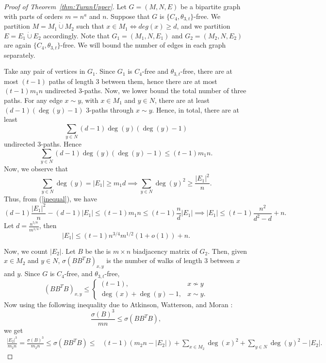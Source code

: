 \documentclass[12pt]{article}
\begin{document}
\begin{proof}[Proof of Theorem~\ref{thm:TuranUpper}]

Let $G=(M,N,E)$ be a bipartite graph with parts of orders $m = n^a$ and $n$.  Suppose that $G$ is $\{ C_4, \theta_{3, t}\}$-free. We partition $M=M_1\dot\cup M_2$ such that $x\in M_1 \iff deg(x) \geq  d$, and we partition $E=E_1\dot\cup E_2$ accordingly. Note that $G_1=(M_1,N,E_1)$ and $G_2=(M_2,N,E_2)$ are again $\{ C_4, \theta_{3, t}\}$-free. We will bound the number of edges in each graph separately.
    
    Take any pair of vertices in $G_1$. Since $G_1$ is $C_{4}$-free and $\theta_{3, t}$-free, there are at most $(t-1)$ paths of length 3 between them, hence there are at most $(t-1)m_1n$ undirected 3-paths. Now, we lower bound the total number of three paths. For any edge $x \sim y$, with $x \in M_1$ and $y \in N$, there are at least $(d-1)(\deg(y) - 1)$ 3-paths through $x \sim y$. Hence, in total, there are at least
    $$
    \sum_{y \in N}(d-1)\deg(y)(\deg(y)-1)
    $$
    undirected 3-paths. Hence 
    \begin{equation}\label{inequal}
     \sum_{y \in N}(d-1)\deg(y)(\deg(y)-1) \leq (t-1)m_1n.
    \end{equation}
    Now, we observe that 
    $$
    \sum_{y\in N}\deg(y)=|E_1| \geq m_1d \implies \sum_{y \in N}\deg(y)^2 \geq \frac{|E_1|^2}{n}.
    $$
    Thus, from (\ref{inequal}), we have
    $$
    (d-1)\frac{|E_1|^2}{n} - (d-1)|E_1| \leq (t-1)m_1n \leq (t-1)\frac{n}{d}|E_1|\implies |E_1|\leq   (t-1)\frac{n^2}{d^2-d}+n.
    $$
    Let $d = \frac{n^{5/8}}{m^{1/4}}$, then 
    $$
    |E_1| \leq (t-1)n^{3/4}m^{1/2}\left(1+o(1)\right)+n.
    $$
    
    
   Now, we count $|E_2|$.  
    Let $B$ be the is $m \times n$ biadjacency matrix of $G_2$. Then, given $x\in M_2$ and $y\in N$, $\sigma(BB^TB)_{x, y}$ is the number of walks of length $3$ between $x$ and $y$. Since $G$ is $C_4$-free, and $\theta_{3, t}$-free, 
    $$
    (BB^TB)_{x, y} \leq \left\{ \begin{array}{cc}
        (t-1), & x \not\sim y \\
        \deg(x) + \deg(y) - 1, & x \sim y .
    \end{array} \right.
    $$
    Now using the following inequality due to Atkinson, Watterson, and Moran \cite{AtkinsonWattersonMoran1959}:
    \begin{equation}\label{Atkinson}
        \frac{\sigma(B)^3}{mn} \leq \sigma(BB^TB),
    \end{equation} 
    we get
    \begin{align*}
    \frac{|E_2|^3}{m_2n}=\frac{\sigma(B)^3}{m_2n}\leq\sigma(BB^TB) \leq& (t-1)(m_2n - |E_2|) + \sum_{x \in M_2}\deg(x)^2+ \sum_{y \in N}\deg(y)^2-|E_2|. 
    \end{align*}


\end{proof}
\end{document}
